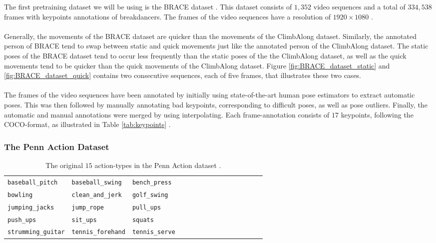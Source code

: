 \documentclass[./main.tex]{subfiles}
\begin{document}
\noindent The first pretraining dataset we will be using is the BRACE dataset \cite{BRACE}. This dataset consists of $1,352$ video sequences and a total of $334,538$ frames with keypoints annotations of breakdancers. The frames of the video sequences have a resolution of $1920 \times 1080$ \cite{BRACE}.
\\
\\
Generally, the movements of the BRACE dataset are quicker than the movements of the ClimbAlong dataset. Similarly, the annotated person of BRACE tend to swap between static and quick movements just like the annotated person of the ClimbAlong dataset. The static poses of the BRACE dataset tend to occur less frequently than the static poses of the the ClimbAlong dataset, as well as the quick movements tend to be quicker than the quick movements of the ClimbAlong dataset. Figure \ref{fig:BRACE_dataset_static} and \ref{fig:BRACE_dataset_quick} contains two consecutive sequences, each of five frames, that illustrates these two cases.
\\
\\
The frames of the video sequences have been annotated by initially using state-of-the-art human pose estimators to extract automatic poses. This was then followed by manually annotating bad keypoints, corresponding to difficult poses, as well as pose outliers. Finally, the automatic and manual annotations were merged by using interpolating. Each frame-annotation consists of $17$ keypoints, following the COCO-format, as illustrated in Table \ref{tab:keypoints} \cite{BRACE}.

\subsubsection{The Penn Action Dataset}
\label{sec:PA}
\begin{table}
    \begin{tabular}[htbp]{lllllllllllllll}
        \texttt{baseball\_pitch} & \texttt{baseball\_swing} & \texttt{bench\_press} \\
        \texttt{bowling} & \texttt{clean\_and\_jerk} & \texttt{golf\_swing} \\
        \texttt{jumping\_jacks} & \texttt{jump\_rope} & \texttt{pull\_ups} \\
        \texttt{push\_ups} & \texttt{sit\_ups} & \texttt{squats} \\
        \texttt{strumming\_guitar} & \texttt{tennis\_forehand} & \texttt{tennis\_serve}
    \end{tabular}
    \caption{The original $15$ action-types in the Penn Action dataset \cite{penn_action}.}
    \label{tab:PA_actions}
\end{table}
\end{document}
